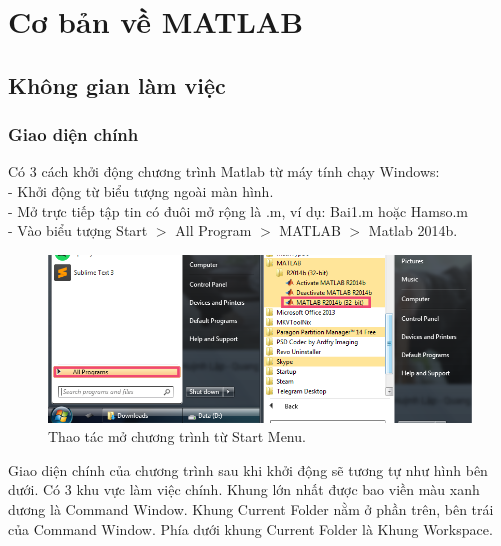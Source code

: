 \documentclass[12pt,a4paper]{article}
\begin{document}
\renewcommand\thesection{\Roman{section}}
\renewcommand\thesubsection{\arabic{subsection}}
\renewcommand\thesubsubsection{\alph{subsubsection}}

\tableofcontents

\section{Cơ bản về MATLAB}
\subsection{Không gian làm việc}
\subsubsection{Giao diện chính}
Có 3 cách khởi động chương trình Matlab từ máy tính chạy Windows:\\
- Khởi động từ biểu tượng ngoài màn hình.\\
- Mở trực tiếp tập tin có đuôi mở rộng là .m, ví dụ: Bai1.m hoặc Hamso.m\\
- Vào biểu tượng Start $>$ All Program $>$ MATLAB $>$ Matlab 2014b.\\
\begin{center}
    \begin{figure}[htp]
    \begin{center}
     \includegraphics[scale=.7]{hinhtieuluan/pic1.png}
    \end{center}
    \caption{Thao tác mở chương trình từ Start Menu.}
    \label{refhinh1}
    \end{figure}
\end{center}
Giao diện chính của chương trình sau khi khởi động sẽ tương tự như hình bên dưới. Có 3 khu vực làm việc chính. Khung lớn nhất được bao viền màu xanh dương là Command Window. Khung Current Folder nằm ở phần trên, bên trái của Command Window. Phía dưới khung Current Folder là Khung Workspace.\\
\end{document}
